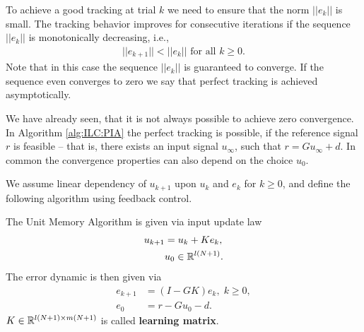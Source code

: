 To achieve a good tracking at trial $k$ we need to ensure that the norm $||e_k||$ is small. 
The tracking behavior improves for consecutive iterations if the sequence $||e_k||$ is monotonically decreasing, i.e., 
\begin{align}
\label{eq:ILC:monotonisity}
||e_{k+1} || < ||e_k|| \text{ for all } k \geq 0.
\end{align}
Note that in this case the sequence $||e_k||$ is guaranteed to converge. If the sequence even converges to zero we say that perfect tracking is achieved asymptotically.


We have already seen, that it is not always possible to achieve zero convergence. In Algorithm \ref{alg:ILC:PIA} the perfect tracking is possible, if the reference signal $r$ is feasible -- that is, there exists an input signal $u_\infty$, such that $r = G u_\infty + d$. In common the convergence properties can also depend on the choice $u_0$.



We assume linear dependency of $u_{k+1}$ upon $u_k$ and $e_k$ for $k \geq 0$, and define the following algorithm using feedback control. 
\begin{alg}
	\label{alg: unitMemory}
	The Unit Memory Algorithm is given via input update law 
	\begin{align}
	\label{eq:clPlant}
	\begin{split}
	u_{k+1} &= u_k + K e_k, \\
	& u_0 \in {\mathbb{R}}^{l (N+1)}.
	\end{split}
	\end{align}	 
	The error dynamic is then given via
	\begin{align}
	e _{k+1} &= (I - G K) e_{k}, \; k \geq 0,\\
	e_0 &= r -  Gu_0 -d.
	\end{align}
	$K \in {\mathbb{R}}^{l(N+1) \times m(N+1)}$ is called \textbf{learning matrix}. 
\end{alg}

